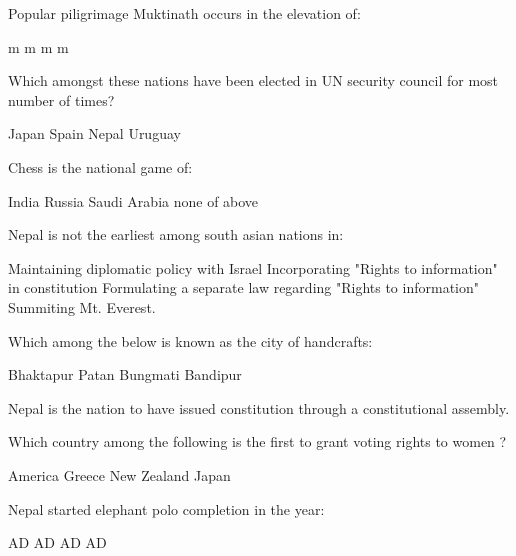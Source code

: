 \begin{questions}
\question Popular piligrimage Muktinath occurs in the elevation of:
  \begin{choices}
   m
   m
   m
   m
  \end{choices}

\question Which amongst these nations have been elected in UN security council for most number of times?
  \begin{choices}
  \choice Japan
  \choice Spain
  \choice Nepal
  \CorrectChoice Uruguay
  \end{choices}

\question Chess is the national game of:

  \begin{oneparchoices}
  \choice India
  \CorrectChoice Russia
  \choice Saudi Arabia
  \choice none of above
  \end{oneparchoices}

\question Nepal is not the earliest among south asian nations in:
  \begin{choices}
  \choice Maintaining diplomatic policy with Israel
  \CorrectChoice Incorporating "Rights to information" in constitution
  \choice Formulating a separate law regarding "Rights to information"
  \choice Summiting Mt. Everest.
  \end{choices}

\question Which among the below is known as the city of handcrafts:
  \begin{choices}
  \choice Bhaktapur
  \CorrectChoice Patan
  \choice Bungmati
  \choice Bandipur
  \end{choices}

\question Nepal is the \fillin[][2cm] nation to have issued constitution through a constitutional assembly.
  \begin{choices}
  \end{choices}

\question Which country among the following is the first to grant voting rights to women ?
  \begin{choices}
  \choice America
  \choice Greece
  \CorrectChoice New Zealand
  \choice Japan
  \end{choices}

\question Nepal started elephant polo completion in the year:
  \begin{choices}
   AD
   AD
   AD
   AD
  \end{choices}


\end{questions}
